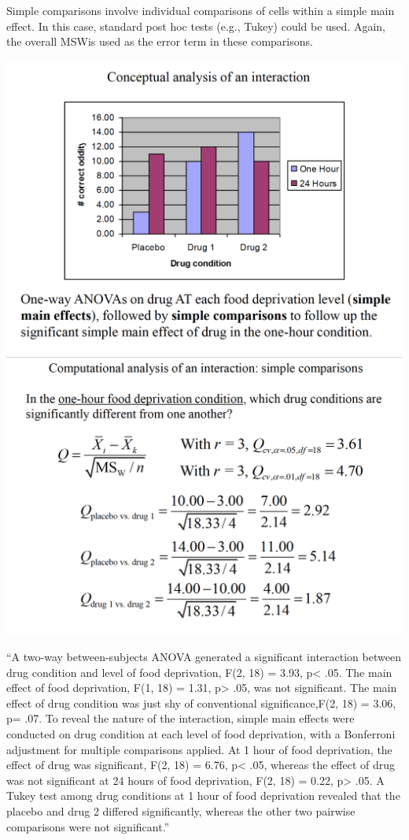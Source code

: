 \documentclass[]{book}
\theoremstyle{definition}
\theoremstyle{definition}
\theoremstyle{definition}
\theoremstyle{remark}
\begin{document}
Simple comparisons involve individual comparisons of cells within a
simple main effect. In this case, standard post hoc tests (e.g., Tukey)
could be used. Again, the overall MSWis used as the error term in these
comparisons.

\includegraphics{img/hicksfa22.png} \includegraphics{img/hicksfa23.png}

``A two-way between-subjects ANOVA generated a significant interaction
between drug condition and level of food deprivation, F(2, 18) = 3.93,
p\textless{} .05. The main effect of food deprivation, F(1, 18) = 1.31,
p\textgreater{} .05, was not significant. The main effect of drug
condition was just shy of conventional significance,F(2, 18) = 3.06, p=
.07. To reveal the nature of the interaction, simple main effects were
conducted on drug condition at each level of food deprivation, with a
Bonferroni adjustment for multiple comparisons applied. At 1 hour of
food deprivation, the effect of drug was significant, F(2, 18) = 6.76,
p\textless{} .05, whereas the effect of drug was not significant at 24
hours of food deprivation, F(2, 18) = 0.22, p\textgreater{} .05. A Tukey
test among drug conditions at 1 hour of food deprivation revealed that
the placebo and drug 2 differed significantly, whereas the other two
pairwise comparisons were not significant.''
\end{document}
